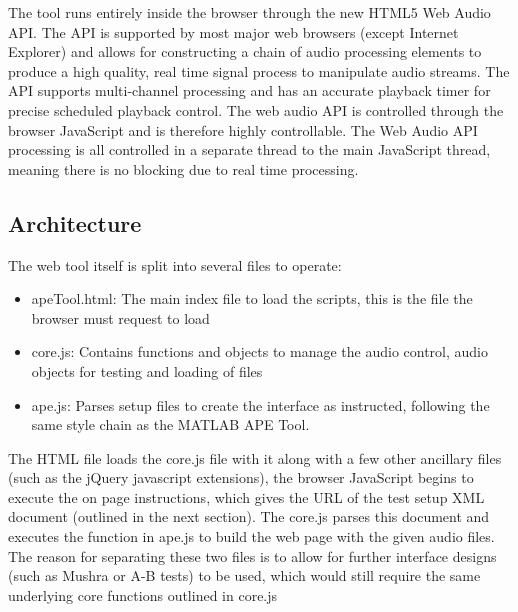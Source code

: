 \documentclass{article}
\begin{document}


The tool runs entirely inside the browser through the new HTML5 Web Audio API. The API is supported by most major web browsers (except Internet Explorer) and allows for constructing a chain of audio processing elements to produce a high quality, real time signal process to manipulate audio streams. The API supports multi-channel processing and has an accurate playback timer for precise scheduled playback control. The web audio API is controlled through the browser JavaScript and is therefore highly controllable. The Web Audio API processing is all controlled in a separate thread to the main JavaScript thread, meaning there is no blocking due to real time processing.

\subsection{Architecture}\label{sec:architecture}

The web tool itself is split into several files to operate:
\begin{itemize}
\item apeTool.html: The main index file to load the scripts, this is the file the browser must request to load
\item core.js: Contains functions and objects to manage the audio control, audio objects for testing and loading of files
\item ape.js: Parses setup files to create the interface as instructed, following the same style chain as the MATLAB APE Tool.
\end{itemize}

The HTML file loads the core.js file with it along with a few other ancillary files (such as the jQuery javascript extensions), the browser JavaScript begins to execute the on page instructions, which gives the URL of the test setup XML document (outlined in the next section). The core.js parses this document and executes the function in ape.js to build the web page with the given audio files. The reason for separating these two files is to allow for further interface designs (such as Mushra or A-B tests) to be used, which would still require the same underlying core functions outlined in core.js
\end{document}
